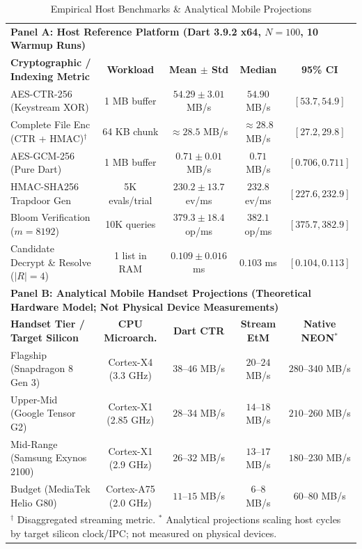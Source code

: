 \documentclass[10pt,conference]{IEEEtran}
\begin{document}
\begin{table}[t]
\centering
\caption{Empirical Host Benchmarks \& Analytical Mobile Projections}
\label{tab:benchmarks}
\fontsize{6.0pt}{6.7pt}\selectfont
\setlength{\tabcolsep}{2.5pt}
\renewcommand{\arraystretch}{0.68}
\begin{tabular}{lcccc}
\toprule
\multicolumn{5}{l}{\textbf{Panel A: Host Reference Platform (Dart 3.9.2 x64, $N=100$, 10 Warmup Runs)}} \\
\textbf{Cryptographic / Indexing Metric} & \textbf{Workload} & \textbf{Mean $\pm$ Std} & \textbf{Median} & \textbf{95\% CI} \\
\midrule
AES-CTR-256 (Keystream XOR) & 1 MB buffer & $54.29 \pm 3.01$ MB/s & $54.90$ MB/s & $[53.7, 54.9]$ \\
Complete File Enc (CTR + HMAC)$^\dagger$ & 64 KB chunk & $\approx 28.5$ MB/s & $\approx 28.8$ MB/s & $[27.2, 29.8]$ \\
AES-GCM-256 (Pure Dart) & 1 MB buffer & $0.71 \pm 0.01$ MB/s & $0.71$ MB/s & $[0.706, 0.711]$ \\
HMAC-SHA256 Trapdoor Gen & 5K evals/trial & $230.2 \pm 13.7$ ev/ms & $232.8$ ev/ms & $[227.6, 232.9]$ \\
Bloom Verification ($m=8192$) & 10K queries & $379.3 \pm 18.4$ op/ms & $382.1$ op/ms & $[375.7, 382.9]$ \\
Candidate Decrypt \& Resolve ($|R|=4$) & 1 list in RAM & $0.109 \pm 0.016$ ms & $0.103$ ms & $[0.104, 0.113]$ \\
\midrule
\multicolumn{5}{l}{\textbf{Panel B: Analytical Mobile Handset Projections (Theoretical Hardware Model; Not Physical Device Measurements)}} \\
\textbf{Handset Tier / Target Silicon} & \textbf{CPU Microarch.} & \textbf{Dart CTR} & \textbf{Stream EtM} & \textbf{Native NEON}$^*$ \\
\midrule
Flagship (Snapdragon 8 Gen 3) & Cortex-X4 (3.3 GHz) & $38$--$46$ MB/s & $20$--$24$ MB/s & $280$--$340$ MB/s \\
Upper-Mid (Google Tensor G2) & Cortex-X1 (2.85 GHz) & $28$--$34$ MB/s & $14$--$18$ MB/s & $210$--$260$ MB/s \\
Mid-Range (Samsung Exynos 2100) & Cortex-X1 (2.9 GHz) & $26$--$32$ MB/s & $13$--$17$ MB/s & $180$--$230$ MB/s \\
Budget (MediaTek Helio G80) & Cortex-A75 (2.0 GHz) & $11$--$15$ MB/s & $6$--$8$ MB/s & $60$--$80$ MB/s \\
\bottomrule
\multicolumn{5}{l}{\fontsize{5.6pt}{6.4pt}\selectfont $^\dagger$ Disaggregated streaming metric. $^*$ Analytical projections scaling host cycles by target silicon clock/IPC; not measured on physical devices.}
\end{tabular}
\end{table}
\end{document}
